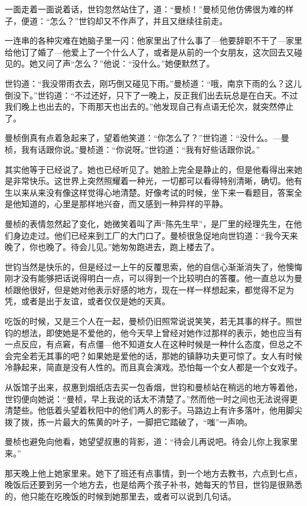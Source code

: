 \par 一面走着一面说着话，世钧忽然站住了，道：“曼桢！”曼桢见他仿佛很为难的样子，便道：“怎么？”世钧却又不作声了，并且又继续往前走。
\par 一连串的各种灾难在她脑子里一闪：他家里出了什么事了—他要辞职不干了—家里给他订了婚了—他爱上了一个什么人了，或者是从前的一个女朋友，这次回去又碰见的。她又问了声“怎么？”他说：“没什么。”她便默然了。
\par 世钧道：“我没带雨衣去，刚巧倒又碰见下雨。”曼桢道：“哦，南京下雨的么？这儿倒没下。”世钧道：“不过还好，只下了一晚上，反正我们出去玩总是在白天。不过我们晚上也出去的，下雨那天也出去的。”他发现自己有点语无伦次，就突然停止了。
\par 曼桢倒真有点着急起来了，望着他笑道：“你怎么了？”世钧道：“没什么。—曼桢，我有话跟你说。”曼桢道：“你说呀。”世钧道：“我有好些话跟你说。”
\par 其实他等于已经说了。她也已经听见了。她脸上完全是静止的，但是他看得出来她是非常快乐。这世界上突然照耀着一种光，一切都可以看得特别清晰，确切。他有生以来从来没有像这样觉得心地清楚。好像考试的时候，坐下来一看题目，答案全是他知道的，心里是那样地兴奋，而又感到一种异样的平静。
\par 曼桢的表情忽然起了变化，她微笑着叫了声“陈先生早”，是厂里的经理先生，在他们身边走过。他们已经来到工厂的大门口了。曼桢很急促地向世钧道：“我今天来晚了，你也晚了。待会儿见。”她匆匆跑进去，跑上楼去了。
\par 世钧当然是快乐的，但是经过一上午的反覆思索，他的自信心渐渐消失了，他懊悔刚才没有能够把话说得明白一点，可以得到一个比较明白的答覆。他一直总以为曼桢跟他很好，但是她对他表示好感的地方，现在一样一样想起来，都觉得不足为凭，或者是出于友谊，或者仅仅是她的天真。
\par 吃饭的时候，又是三个人在一起，曼桢仍旧照常说说笑笑，若无其事的样子。照世钧的想法，即使她是不爱他的，他今天早上曾经对她作过那样的表示，她也应当有一点反应，有点窘，有点僵—他不知道女人在这种时候是一种什么态度，但总之不会完全若无其事的吧？如果她是爱他的话，那她的镇静功夫更可惊了。女人有时候冷静起来，简直是没有人性的。而且真会演戏。恐怕每一个女人都是一个女戏子。
\par 从饭馆子出来，叔惠到烟纸店去买一包香烟，世钧和曼桢站在稍远的地方等着他，世钧便向她说：“曼桢，早上我说的话太不清楚了。”然而他一时之间也无法说得更清楚些。他低着头望着秋阳中的他们两人的影子。马路边上有许多落叶，他用脚尖拨了拨，拣一片最大的焦黄的叶子，一脚把它踏破了，“嗤”一声响。
\par 曼桢也避免向他看，她望望叔惠的背影，道：“待会儿再说吧。待会儿你上我家里来。”
\par 那天晚上他上她家里来。她下了班还有点事情，到一个地方去教书，六点到七点，晚饭后还要到另一个地方去，也是给两个孩子补书，她每天的节目，世钧是很熟悉的，他只能在吃晚饭的时候到她那里去，或者可以说到几句话。
